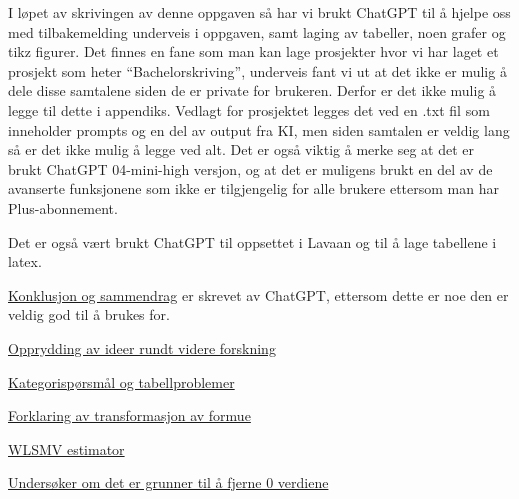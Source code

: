 \documentclass[
  12pt,
  a4paper,
  DIV=11,
  numbers=noendperiod]{scrartcl}
\begin{document}
I løpet av skrivingen av denne oppgaven så har vi brukt ChatGPT til å
hjelpe oss med tilbakemelding underveis i oppgaven, samt laging av
tabeller, noen grafer og tikz figurer. Det finnes en fane som man kan
lage prosjekter hvor vi har laget et prosjekt som heter
``Bachelorskriving'', underveis fant vi ut at det ikke er mulig å dele
disse samtalene siden de er private for brukeren. Derfor er det ikke
mulig å legge til dette i appendiks. Vedlagt for prosjektet legges det
ved en .txt fil som inneholder prompts og en del av output fra KI, men
siden samtalen er veldig lang så er det ikke mulig å legge ved alt. Det
er også viktig å merke seg at det er brukt ChatGPT 04-mini-high versjon,
og at det er muligens brukt en del av de avanserte funksjonene som ikke
er tilgjengelig for alle brukere ettersom man har Plus-abonnement.

Det er også vært brukt ChatGPT til oppsettet i Lavaan og til å lage
tabellene i latex.

\href{https://chatgpt.com/share/683d8c4a-308c-8001-a893-50b7c6211421}{Konklusjon
og sammendrag} er skrevet av ChatGPT, ettersom dette er noe den er
veldig god til å brukes for.

\href{https://chatgpt.com/share/683d8d67-1bb0-8006-a168-0f8c9175261a}{Opprydding
av ideer rundt videre forskning}

\href{https://chatgpt.com/share/683d8de1-9a80-8006-a988-80f31a685b29}{Kategorispørsmål
og tabellproblemer}

\href{https://chatgpt.com/share/683d8e28-ffc8-8006-9d78-81d7678fc440}{Forklaring
av transformasjon av formue}

\href{https://chatgpt.com/share/683d8e70-d9ac-8006-877d-57981c06ba49}{WLSMV
estimator}

\href{https://chatgpt.com/share/683d8eb5-9a90-8006-b1a0-be774dcdcc1b}{Undersøker
om det er grunner til å fjerne 0 verdiene}
\end{document}
